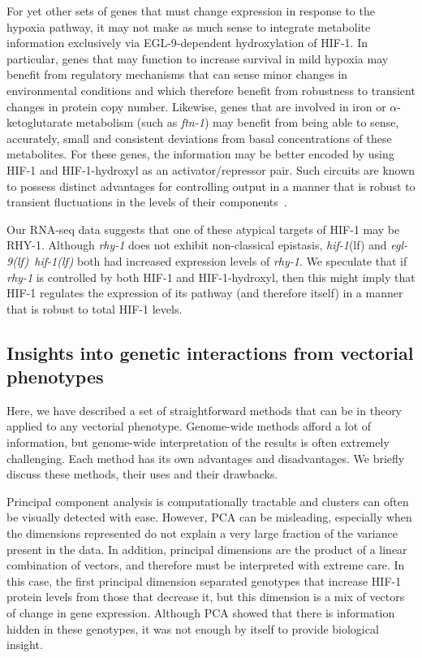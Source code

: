 \documentclass[10pt, onecolumn]{article}
\newcommand{\gene}[1]{\emph{#1}}
\newcommand{\ftna}{\emph{\mbox{ftn-1}}}
\newcommand{\eglhif}{\emph{\mbox{egl-9(lf)}~\mbox{hif-1(lf)}}}
\newcommand{\hif}{\emph{\mbox{hif-1}}(lf)}
\newcommand{\eglp}{EGL-9}
\newcommand{\rhyp}{RHY-1}
\newcommand{\hifp}{HIF-1}
\begin{document}
For yet other sets of genes that must change expression in response to the hypoxia
pathway, it may not make as much sense to integrate metabolite information
exclusively via \eglp{}-dependent hydroxylation of \hifp{}. In particular, genes
that may function to increase survival in mild hypoxia may benefit from regulatory
mechanisms that can sense minor changes in environmental conditions and which
therefore benefit from robustness to transient changes in protein copy number.
Likewise, genes that are involved in iron or $\alpha$-ketoglutarate metabolism
(such as \ftna{}) may benefit from being able to sense, accurately, small and
consistent deviations from basal concentrations of these metabolites. For these
genes, the information may be better encoded by using \hifp{} and
\hifp{}-hydroxyl as an activator/repressor pair. Such circuits are
known to possess distinct advantages for controlling output in a manner that
is robust to transient fluctuations in the levels of their
components~\cite{Hart2012,Hart2013}.

Our RNA-seq data suggests that one of these atypical targets of \hifp{}
may be \rhyp{}. Although \gene{rhy-1} does not exhibit non-classical
epistasis, \hif{} and \eglhif{} both had increased expression levels of \gene{rhy-1}.
We speculate that if \gene{rhy-1} is controlled by both \hifp{} and \hifp{}-hydroxyl,
then this might imply that \hifp{} regulates the expression of its pathway (and
therefore itself) in a manner that is robust to total \hifp{} levels.

\subsection*{Insights into genetic interactions from vectorial phenotypes}

Here, we have described a set of straightforward methods that can be in theory
applied to any vectorial phenotype. Genome-wide methods afford a lot of information,
but genome-wide interpretation of the results is often extremely challenging.
Each method has its own advantages and disadvantages. We briefly discuss these
methods, their uses and their drawbacks.

Principal component analysis
is computationally tractable and clusters can often be visually detected with
ease. However, PCA can be misleading, especially when the dimensions represented
do not explain a very large fraction of the variance present in the data. In addition,
principal dimensions are the product of a linear combination of vectors, and therefore
must be interpreted with extreme care. In this case, the first principal dimension
separated genotypes that increase \hifp{} protein levels from those that decrease
it, but this dimension is a mix of vectors of change in gene expression. Although
PCA showed that there is information hidden in these genotypes, it was not enough by
itself to provide biological insight.
\end{document}
